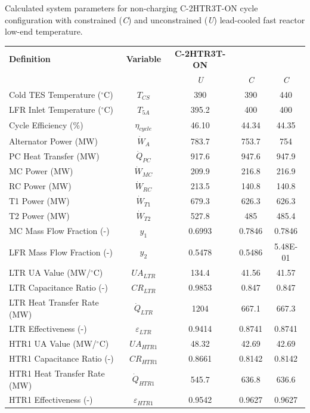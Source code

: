 \begin{paracol}{2}
\begin{specialtable}[H]
    \caption{Calculated system parameters for non-charging C-2HTR3T-ON cycle configuration with constrained (\textit{C}) and unconstrained (\textit{U}) lead-cooled fast reactor low-end temperature.\label{tab-c-2htr3t-on}}
    \begin{tabular}{lcccc}
    \toprule
    \textbf{Definition} & \textbf{Variable} & \textbf{C-2HTR3T-ON} &\\
    & & \textit{U} & \textit{C} & \textit{C}\\
    \midrule	
    Cold TES Temperature ($^{\circ}$C)	&	$T_{CS}$	&	390	&	390	&	440	\\
    LFR Inlet Temperature ($^{\circ}$C)	&	$T_{5A}$	&	395.2	&	400	&	400	\\
    Cycle Efficiency (\%)	&	$\eta_{cycle}$	&	46.10	&	44.34	&	44.35	\\
    Alternator Power (MW)	&	$\dot{W}_{A}$	&	783.7	&	753.7	&	754	\\
    PC Heat Transfer (MW)	&	$\dot{Q}_{PC}$	&	917.6	&	947.6	&	947.9	\\
    MC Power (MW)	&	$\dot{W}_{MC}$	&	209.9	&	216.8	&	216.9	\\
    RC Power (MW)	&	$\dot{W}_{RC}$	&	213.5	&	140.8	&	140.8	\\
    T1 Power (MW)	&	$\dot{W}_{T1}$	&	679.3	&	626.3	&	626.3	\\
    T2 Power (MW)	&	$\dot{W}_{T2}$	&	527.8	&	485	&	485.4	\\
    MC Mass Flow Fraction (-)	&	$y_{1}$	&	0.6993	&	0.7846	&	0.7846	\\
    LFR Mass Flow Fraction (-)	&	$y_{2}$	&	0.5478	&	0.5486	&	5.48E-01	\\
    LTR UA Value (MW/$^{\circ}$C)	&	$UA_{LTR}$	&	134.4	&	41.56	&	41.57	\\
    LTR Capacitance Ratio (-)	&	$CR_{LTR}$	&	0.9853	&	0.847	&	0.847	\\
    LTR Heat Transfer Rate (MW)	&	$\dot{Q}_{LTR}$	&	1204	&	667.1	&	667.3	\\
    LTR Effectiveness (-)	&	$\varepsilon_{LTR}$	&	0.9414	&	0.8741	&	0.8741	\\
    HTR1 UA Value (MW/$^{\circ}$C)	&	$UA_{HTR1}$	&	48.32	&	42.69	&	42.69	\\
    HTR1 Capacitance Ratio (-)	&	$CR_{HTR1}$	&	0.8661	&	0.8142	&	0.8142	\\
    HTR1 Heat Transfer Rate (MW)	&	$\dot{Q}_{HTR1}$	&	545.7	&	636.8	&	636.6	\\
    HTR1 Effectiveness (-)	&	$\varepsilon_{HTR1}$	&	0.9542	&	0.9627	&	0.9627	\\

\end{tabular}
\end{specialtable}
\end{paracol}
